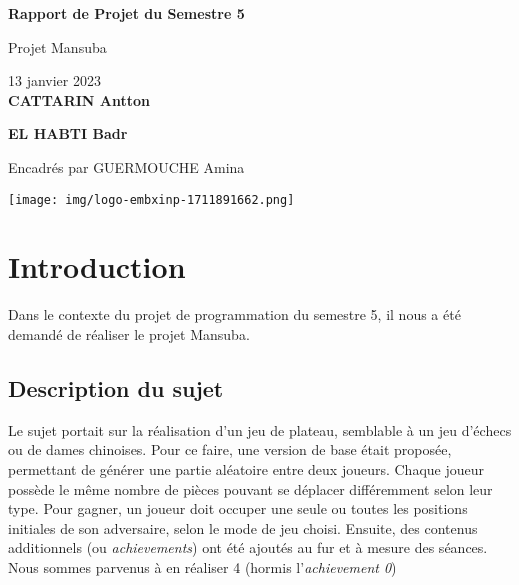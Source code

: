 \documentclass[a4paper]{article}
\begin{document}
\begin{titlepage}
\begin{center}
\vspace*{2cm}
\Huge
\textbf{Rapport de Projet du Semestre 5}

\vspace{0.5cm}
\huge
Projet Mansuba
            
\vspace{0.5cm}
\Large
13 janvier 2023 \\

\vfill
\huge
\textbf{CATTARIN Antton}

\textbf{EL HABTI Badr}

\vspace{0.5cm}
\Large
Encadrés par GUERMOUCHE Amina
       
\vfill

\texttt{[image: img/logo-embxinp-1711891662.png]}

\vspace{0.8cm}
\end{center}
\end{titlepage}

\newpage
\tableofcontents 
\vspace{1cm}
\listoffigures
\newpage

\section{Introduction}
\label{intro}

Dans le contexte du projet de programmation du semestre 5, il nous a été demandé de réaliser le projet Mansuba.

\subsection{Description du sujet}
\label{description}
Le sujet portait sur la réalisation d'un jeu de plateau, semblable à un jeu d'échecs ou de dames chinoises. Pour ce faire, une version de base était proposée, permettant de générer une partie aléatoire entre deux joueurs. Chaque joueur possède le même nombre de pièces pouvant se déplacer différemment selon leur type. Pour gagner, un joueur doit occuper une seule ou toutes les positions initiales de son adversaire, selon le mode de jeu choisi. Ensuite, des contenus additionnels (ou \emph{achievements}) ont été ajoutés au fur et à mesure des séances. Nous sommes parvenus à en réaliser 4 (hormis l'\emph{achievement 0})
\end{document}
